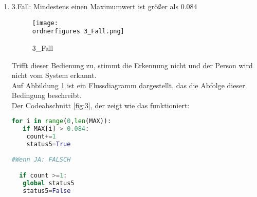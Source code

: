 \begin{enumerate}
\begin{itemize}
\begin{enumerate}
\begin{enumerate}
			Auf Abbildung \ref{fig:2_Fall} ist ein Flussdiagramm dargestellt, das die Abfolge dieser Bedingung beschreibt.\\
			
	Der Codeabschnitt \ref{fig:2}, der zeigt wie das funktioniert:\\
		
		\begin{lstlisting}[caption={2.Fall},label={fig:2}, language=Python]
  count = 0
  for i in range(0,len(MAX)):
   if MAX[i] > 0.07 and MAX[i]< 0.084:
    count+=1
    status3=True
    status33=True
    status4=True
    
#Wenn JA :Wenn gmT kleiner als 0.027 ist passt, 
sonst FALSCH

  if count == 1:
   global status33
   status33=False
  if gmT > 0.027:
   global status3
   status3 = False
   
#Wenn 2 oder mehr: FALSCH

  elif count > 1:
   global status4
   status4 = False
\end{lstlisting}
			
			\item 3.Fall: Mindestens einen Maximumwert ist größer als 0.084 \\
			
				\begin{figure}[H]
				\centering
				\texttt{[image: \\ordnerfigures 3\_Fall.png]}
				\caption{3\_Fall}
				\label{fig:3_Fall}
			\end{figure}
			
			Trifft dieser Bedienung zu, stimmt die Erkennung nicht und der Person wird nicht vom System erkannt.\\
			
			Auf Abbildung \ref{fig:3_Fall} ist ein Flussdiagramm dargestellt, das die Abfolge dieser Bedingung beschreibt.\\
			
		Der Codeabschnitt \ref{fig:3}, der zeigt wie das funktioniert:\\
		
		\begin{lstlisting}[caption={3.Fall},label={fig:3}, language=Python]
  for i in range(0,len(MAX)):
   if MAX[i] > 0.084:
    count+=1
    status5=True
    
#Wenn JA: FALSCH

  if count >=1:
   global status5
   status5=False
\end{lstlisting}
			

\end{enumerate}
\end{enumerate}
\end{itemize}
\end{enumerate}
